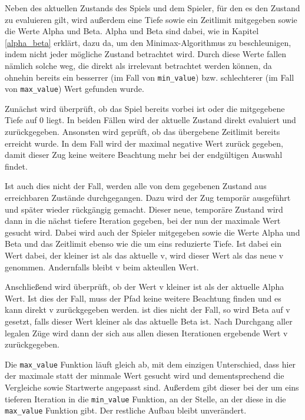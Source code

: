     Neben des aktuellen Zustands des Spiels und dem Spieler,
für den es den Zustand zu evaluieren gilt, wird außerdem eine Tiefe
sowie ein Zeitlimit mitgegeben sowie die Werte Alpha und Beta. Alpha und
Beta sind dabei, wie in Kapitel \ref{alpha_beta} erklärt, dazu da, um den
Minimax-Algorithmus zu beschleunigen, indem nicht jeder mögliche Zustand
betrachtet wird. Durch diese Werte fallen nämlich solche weg, die direkt
als irrelevant betrachtet werden können, da ohnehin bereits ein
besserrer (im Fall von \texttt{min\_value}) bzw. schlechterer (im Fall
von \texttt{max\_value}) Wert gefunden wurde.

Zunächst wird überprüft, ob das Spiel bereits vorbei ist oder die mitgegebene Tiefe auf 0 liegt. 
In beiden Fällen wird der aktuelle Zustand direkt evaluiert und zurückgegeben. Ansonsten 
wird geprüft, ob das übergebene Zeitlimit bereits erreicht wurde. In dem Fall wird der
maximal negative Wert zurück gegeben, damit dieser Zug keine weitere Beachtung 
mehr bei der endgültigen Auswahl findet.

Ist auch dies nicht der Fall, werden alle von dem gegebenen Zustand aus 
erreichbaren Zustände durchgegangen. Dazu wird der Zug temporär ausgeführt 
und später wieder rückgängig gemacht. Dieser neue, temporäre Zustand wird 
dann in die nächst tiefere Iteration gegeben, bei der nun der maximale Wert 
gesucht wird. Dabei wird auch der Spieler mitgegeben sowie die Werte Alpha 
und Beta und das Zeitlimit ebenso wie die um eins reduzierte Tiefe.
Ist dabei ein Wert dabei, der kleiner ist als das aktuelle v, wird dieser Wert als
das neue v genommen. Andernfalls bleibt v beim akteullen Wert.

Anschließend wird überprüft, ob der Wert v kleiner ist als der aktuelle
Alpha Wert. Ist dies der Fall, muss der Pfad keine weitere Beachtung
finden und es kann direkt v zurückgegeben werden. ist dies nicht der
Fall, so wird Beta auf v gesetzt, falls dieser Wert kleiner als das
aktuelle Beta ist. Nach Durchgang aller legalen Züge wird dann der sich
aus allen diesen Iterationen ergebende Wert v zurückgegeben.

Die \texttt{max\_value} Funktion läuft gleich ab, mit dem einzigen
Unterschied, dass hier der maximale statt der minmale Wert gesucht wird
und dementsprechend die Vergleiche sowie Startwerte angepasst sind.
Außerdem gibt dieser bei der um eins tieferen Iteration in die
\texttt{min\_value} Funktion, an der Stelle, an der diese in die
\texttt{max\_value} Funktion gibt. Der restliche Aufbau bleibt
unverändert.

